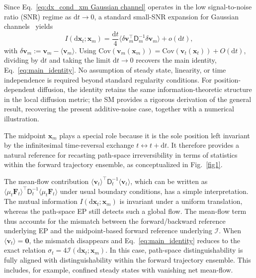 \documentclass[
 longbibliography,
 twocolumn,
 superscriptaddress,
 amsmath,
 amssymb,
 amsthm,
 amsfonts,
 prl,
 floatfix,
]{revtex4-2}
\newcommand{\matbf}[1]{\boldsymbol{\mathsf{#1}}}
\begin{document}
Since Eq.~\eqref{eq:dx_cond_xm Gaussian channel} operates in the low signal-to-noise ratio (SNR) regime as $\mathrm{d}t\rightarrow0$, a standard small-SNR expansion for Gaussian channels~\cite{guo2005mutual} yields
\begin{equation}
    I(\mathrm{d}\bm{x}_t;\bm{x}_m)
    =\frac{\mathrm{d}t}{4}\langle\delta\bm{v}_m^\intercal
    \matbf{D}_m^{-1}
    \delta\bm{v}_m\rangle
    +o(\mathrm{d}t),
\label{eq:dx_xm_I_MMSE_result}
\end{equation}
with $\delta\bm{v}_m:=\bm{v}_m-\langle\bm{v}_m\rangle$. 
Using $\mathrm{Cov}(\bm{v}_m(\bm{x}_m))=\mathrm{Cov}(\bm{v}_t(\bm{x}_t))+O(\mathrm{d}t)$, dividing by $\mathrm{d}t$ and taking the limit $\mathrm{d}t\to0$ recovers the main identity, Eq.~\eqref{eq:main_identity}.
No assumption of steady state, linearity, or time independence is required beyond standard regularity conditions.
For position-dependent diffusion, the identity retains the same information-theoretic structure in the local diffusion metric; the SM provides a rigorous derivation of the general result, recovering the present additive-noise case, together with a numerical illustration.

The midpoint $\bm x_m$ plays a special role because it is the sole position left invariant by the infinitesimal time-reversal exchange $t\leftrightarrow t+\mathrm dt$. It therefore provides a natural reference for recasting path-space irreversibility in terms of statistics within the forward trajectory ensemble, as conceptualized in Fig.~\ref{fig1}.

The mean-flow contribution $\langle\bm v_t\rangle^\intercal\matbf D_t^{-1}\langle\bm v_t\rangle$, which can be written as $\langle\matbf\mu_t\bm F_t\rangle^\intercal\matbf D_t^{-1}\langle\matbf\mu_t\bm F_t\rangle$ under usual boundary conditions, has a simple interpretation. The mutual information $I(\mathrm d\bm x_t;\bm x_m)$ is invariant under a uniform translation, whereas the path-space EP still detects such a global flow. The mean-flow term thus accounts for the mismatch between the forward/backward reference underlying EP and the midpoint-based forward reference underlying $\mathcal I$.
When $\langle\bm v_t\rangle=\bm 0$, the mismatch disappears and Eq.~\eqref{eq:main_identity} reduces to the exact relation $\sigma_t=4\mathcal I(\mathrm d\bm x_t;\bm x_m)$. In this case, path-space distinguishability is fully aligned with distinguishability within the forward trajectory ensemble. This includes, for example, confined steady states with vanishing net mean-flow.
\end{document}
